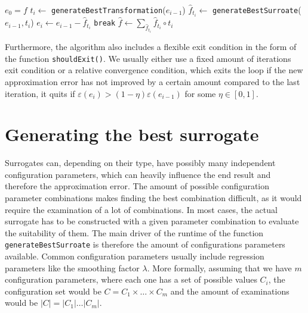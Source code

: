 \documentclass[
  a4paper,  %
  twoside,  %
  bibliography=totoc,
  headsepline,
  cleardoublepage=empty,
  parskip=half,
  draft=false
]{scrbook}
\begin{document}
\begin{mdframed}[style=algstyle,frametitle={\textbf{function} \texttt{transformedSurrogateSum}{$(f)$}}]
\normalsize
\vspace{5.5mm}
\begin{algorithmic}[1]
    \State $e_0 = f$
    	\State $t_i \gets$ \texttt{generateBestTransformation}($e_{i - 1}$)
    	\State $\hat{f}_{t_i} \gets$ \texttt{generateBestSurroate}($e_{i - 1}, t_i$)
    	\State $e_i \gets e_{i - 1} - \hat{f}_{t_i}$
    		\State  \texttt{break}
    	\EndIf
    \EndFor
    \State $\hat{f} \gets \sum_{\hat{f}_{t_i}} \hat{f}_{t_i} \circ t_i$
    \State {}
\end{algorithmic}
\vspace{-1.5mm}
\delimit
	\label{alg:itappr}
\end{mdframed}
%
Furthermore, the algorithm also includes a flexible exit condition in the form of the function \texttt{shouldExit()}.
We usually either use a fixed amount of iterations exit condition or a relative convergence condition, which exits the loop if the new approximation error has not improved by a certain amount compared to the last iteration, \ie it quits if $\varepsilon(e_i) > (1 - \eta) \varepsilon(e_{i - 1})$ for some $\eta \in [0,1]$. 

\section{Generating the best surrogate}
\label{sec:gs}

Surrogates can, depending on their type, have possibly many independent configuration parameters, which can heavily influence the end result and therefore the approximation error.
The amount of possible configuration parameter combinations makes finding the best combination difficult, as it would require the examination of a lot of combinations.
In most cases, the actual surrogate has to be constructed with a given parameter combination to evaluate the suitability of them.
The main driver of the runtime of the function \texttt{generateBestSurroate} is therefore the amount of configurations parameters available.
Common configuration parameters usually include regression parameters like the smoothing factor $\lambda$.
More formally, assuming that we have $m$ configuration parameters, where each one has a set of possible values $C_i$, the configuration set would be $C=C_1 \times \dots \times C_m$ and the amount of examinations would be $|C|=|C_1| \dots |C_m|$.
\end{document}
